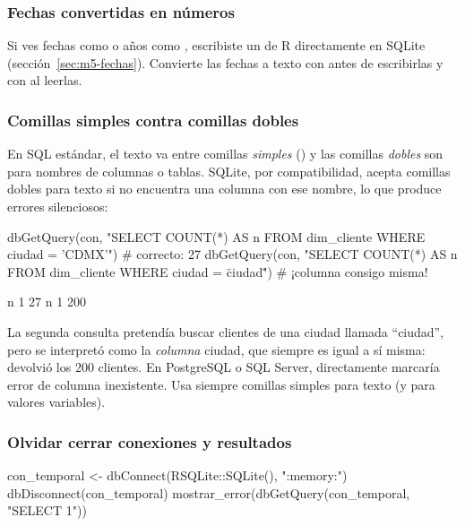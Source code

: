 \subsubsection{Fechas convertidas en números}

Si ves fechas como  o años como , escribiste un
 de R directamente en SQLite (sección~\ref{sec:m5-fechas}).
Convierte las fechas a texto con 
antes de escribirlas y con  al leerlas.

\subsubsection{Comillas simples contra comillas dobles}

En SQL estándar, el texto va entre comillas \emph{simples}
() y las comillas \emph{dobles} son para nombres de
columnas o tablas. SQLite, por compatibilidad, acepta comillas dobles para
texto si no encuentra una columna con ese nombre, lo que produce errores
silenciosos:

\begin{rcode}
dbGetQuery(con, "SELECT COUNT(*) AS n FROM dim_cliente
                 WHERE ciudad = 'CDMX'")     # correcto: 27
dbGetQuery(con, "SELECT COUNT(*) AS n FROM dim_cliente
                 WHERE ciudad = \"ciudad\"")  # ¡columna consigo misma!
\end{rcode}

\begin{rsalida}
   n
1 27
    n
1 200
\end{rsalida}

La segunda consulta pretendía buscar clientes de una ciudad llamada
``ciudad'', pero  se interpretó como la \emph{columna}
ciudad, que siempre es igual a sí misma: devolvió los 200 clientes. En
PostgreSQL o SQL Server,  directamente marcaría error de
columna inexistente. Usa siempre comillas simples para texto (y
 para valores variables).

\subsubsection{Olvidar cerrar conexiones y resultados}

\begin{rcode}
con_temporal <- dbConnect(RSQLite::SQLite(), ":memory:")
dbDisconnect(con_temporal)
mostrar_error(dbGetQuery(con_temporal, "SELECT 1"))
\end{rcode}

